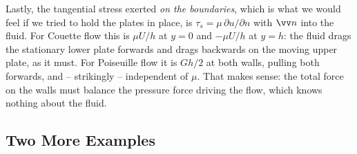 Lastly, the tangential stress exerted \emph{on the boundaries}, which is what we would feel if we tried to hold the plates in place, is $\tau_s = \mu \, \partial u/\partial n$ with $\vv n$ into the fluid. For Couette flow this is $\mu U/h$ at $y = 0$ and $-\mu U /h$ at $y = h$: the fluid drags the stationary lower plate forwards and drags backwards on the moving upper plate, as it must. For Poiseuille flow it is $Gh/2$ at both walls, pulling both forwards, and -- strikingly -- independent of $\mu$. That makes sense: the total force on the walls must balance the pressure force driving the flow, which knows nothing about the fluid.

\subsection{Two More Examples}

